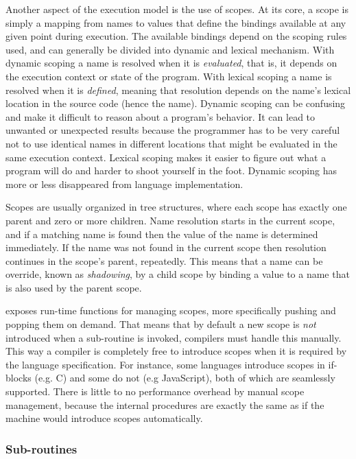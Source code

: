 Another aspect of the execution model is the use of scopes. At its core, a scope
is simply a mapping from names to values that define the bindings available at
any given point during execution. The available bindings depend on the scoping
rules used, and can generally be divided into dynamic and lexical
mechanism. With dynamic scoping a name is resolved when it is \emph{evaluated},
that is, it depends on the execution context or state of the program. With
lexical scoping a name is resolved when it is \emph{defined}, meaning that
resolution depends on the name's lexical location in the source code (hence the
name). Dynamic scoping can be confusing and make it difficult to reason about a
program's behavior. It can lead to unwanted or unexpected results because the
programmer has to be very careful not to use identical names in different
locations that might be evaluated in the same execution context. Lexical scoping
makes it easier to figure out what a program will do and harder to shoot
yourself in the foot. Dynamic scoping has more or less disappeared from language
implementation\cite{cse341}.

Scopes are usually organized in tree structures, where each scope has exactly
one parent and zero or more children. Name resolution starts in the current
scope, and if a matching name is found then the value of the name is determined
immediately. If the name was not found in the current scope then resolution
continues in the scope's parent, repeatedly. This means that a name can be
override, known as \textit{shadowing}, by a child scope by binding a value to a
name that is also used by the parent scope.

\thename{} exposes run-time functions for managing scopes, more specifically
pushing and popping them on demand. That means that by default a new scope is
\textit{not} introduced when a sub-routine is invoked, compilers must handle
this manually. This way a compiler is completely free to introduce scopes when
it is required by the language specification. For instance, some languages
introduce scopes in if-blocks (e.g. C) and some do not (e.g JavaScript), both of
which are seamlessly supported. There is little to no performance overhead by
manual scope management, because the internal procedures are exactly the same as
if the machine would introduce scopes automatically.

\subsubsection{Sub-routines}

